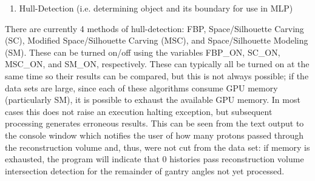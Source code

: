 \documentclass{article}
\begin{document}
\begin{enumerate}[label = (\arabic*), leftmargin = 0.0cm, resume = section]
\bfseries
\item Hull-Detection (i.e. determining object and its boundary for use in MLP)
\end{enumerate}
There are currently 4 methods of hull-detection: FBP, Space/Silhouette Carving (SC), Modified Space/Silhouette Carving (MSC), and Space/Silhouette Modeling (SM).  These can be turned on/off using the variables FBP\_ON, SC\_ON, MSC\_ON, and SM\_ON, respectively.  These can typically all be turned on at the same time so their results can be compared, but this is not always possible; if the data sets are large, since each of these algorithms consume GPU memory (particularly SM), it is possible to exhaust the available GPU memory.  In most cases this does not raise an execution halting exception, but subsequent processing generates erroneous results.  This can be seen from the text output to the console window which notifies the user of how many protons passed through the reconstruction volume and, thus, were not cut from the data set: if memory is exhausted, the program will indicate that 0 histories pass reconstruction volume intersection detection for the remainder of gantry angles not yet processed.
\end{document}
